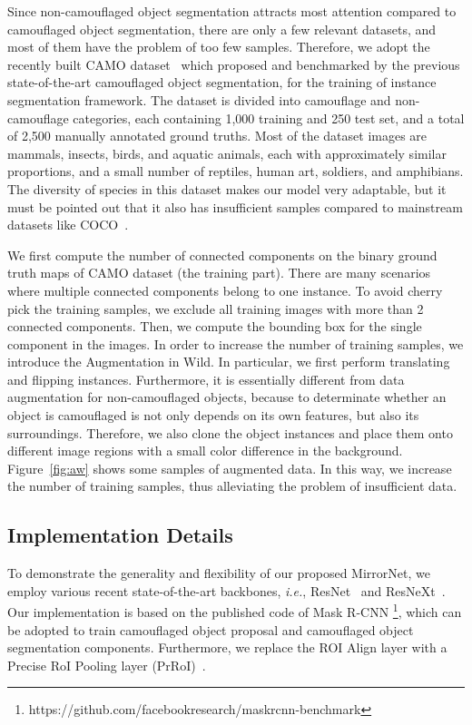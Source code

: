 \documentclass[journal]{IEEEtran}
\begin{document}
Since non-camouflaged object segmentation attracts most attention compared to camouflaged object segmentation, there are only a few relevant datasets, and most of them have the problem of too few samples. Therefore, we adopt the recently built CAMO dataset~\cite{CAMO} which proposed and benchmarked by the previous state-of-the-art camouflaged object segmentation, for the training of instance segmentation framework. The dataset is divided into camouflage and non-camouflage categories, each containing 1,000 training and 250 test set, and a total of 2,500 manually annotated ground truths. Most of the dataset images are mammals, insects, birds, and aquatic animals, each with approximately similar proportions, and a small number of reptiles, human art, soldiers, and amphibians. The diversity of species in this dataset makes our model very adaptable, but it must be pointed out that it also has insufficient samples compared to mainstream datasets like COCO~\cite{Lin-ECCV2014}. 



We first compute the number of connected components on the binary ground truth maps of CAMO dataset (the training part). There are many scenarios where multiple connected components belong to one instance. To avoid cherry pick the training samples, we exclude all training images with more than 2 connected components. Then, we compute the bounding box for the single component in the images. In order to increase the number of training samples, we introduce the Augmentation in Wild. In particular, we first perform translating and flipping instances. Furthermore, it is essentially different from data augmentation for non-camouflaged objects, because to determinate whether an object is camouflaged is not only depends on its own features, but also its surroundings. Therefore, we also clone the object instances and place them onto different image regions with a small color difference in the background. Figure~\ref{fig:aw} shows some samples of augmented data. In this way, we increase the number of training samples, thus alleviating the problem of insufficient data.

\subsection{Implementation Details}
To demonstrate the generality and flexibility of our proposed MirrorNet, we employ various recent state-of-the-art backbones, \textit{i.e.},  ResNet~\cite{He-CVPR2016} and ResNeXt~\cite{resnext}. Our implementation is based on the published code of Mask R-CNN \footnote{https://github.com/facebookresearch/maskrcnn-benchmark}, which can be adopted to train camouflaged object proposal and camouflaged object segmentation components. Furthermore, we replace the ROI Align layer with a Precise RoI Pooling layer (PrRoI)~\cite{PrROI}. 
\end{document}
